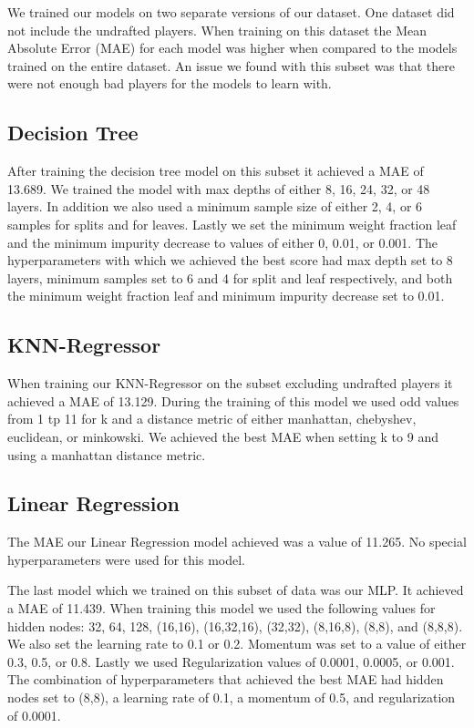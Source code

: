 \documentclass{article}
\begin{document}

We trained our models on two separate versions of our dataset. One dataset did not include
the undrafted players. When training on this dataset the Mean Absolute Error (MAE) for each model was higher 
when compared to the models trained on the entire dataset. An issue we found with this subset was that there
were not enough bad players for the models to learn with.

\subsection{Decision Tree}

After training the decision tree model on this subset it achieved a MAE of 13.689. 
We trained the model with max depths of either 8, 16, 24, 32, or 48 layers. In addition we also used a minimum sample size of either 2, 4, or 6 samples 
for splits and for leaves. Lastly we set the minimum weight fraction leaf and the minimum impurity decrease to values of either 0, 0.01, or 0.001.
The hyperparameters with which we achieved the best score had max depth set to 8 layers, minimum samples set to 6 and 4 for split and leaf respectively, and both the minimum weight fraction leaf and minimum impurity decrease set to 0.01.

\subsection{KNN-Regressor}

When training our KNN-Regressor on the subset excluding undrafted players it achieved a MAE of 13.129.
During the training of this model we used odd values from 1 tp 11 for k and a distance metric of either manhattan, chebyshev, euclidean, or minkowski.
We achieved the best MAE when setting k to 9 and using a manhattan distance metric.
\subsection{Linear Regression}
The MAE our Linear Regression model achieved was a value of 11.265.
No special hyperparameters were used for this model.


The last model which we trained on this subset of data was our MLP. It achieved a MAE of 11.439.
When training this model we used the following values for hidden nodes: 32, 64, 128, (16,16), (16,32,16), (32,32), (8,16,8), (8,8), and (8,8,8).
We also set the learning rate to 0.1 or 0.2. Momentum was set to a value of either 0.3, 0.5, or 0.8. 
Lastly we used Regularization values of 0.0001, 0.0005, or 0.001.
The combination of hyperparameters that achieved the best MAE had hidden nodes set to (8,8), a learning rate of 0.1,
a momentum of 0.5, and regularization of 0.0001.
\end{document}
